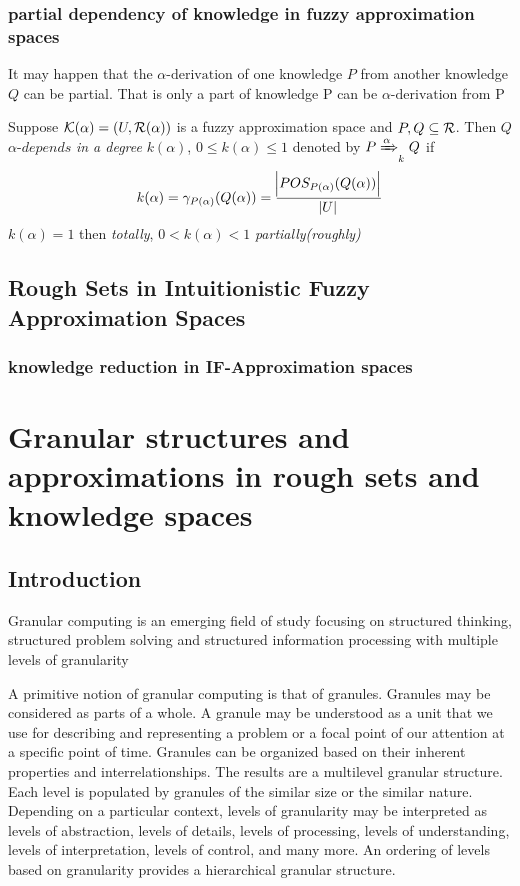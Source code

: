 \documentclass[11pt]{article}
\begin{document}
\subsubsection{partial dependency of knowledge in fuzzy approximation spaces}
\label{sec:org0351901}
It may happen that the \(\alpha\text{-derivation}\) of one knowledge \(P\) from
another knowledge \(Q\) can be partial. That is only a part of knowledge P can
be \(\alpha\text{-derivation}\) from P 

Suppose \(\mathcal{K}(\alpha)=(U,\mathcal{R}(\alpha))\) is a fuzzy approximation space and
\(P,Q\subseteq \mathcal{R}\). Then \(Q\) \(\alpha\textit{-depends}\) \emph{in a degree}
\(k(\alpha)\), \(0\le k(\alpha)\le 1\) denoted by \(P\xRightarrow{\alpha}_{k}Q\)
if 
\begin{equation*}
k(\alpha)=\gamma_{P(\alpha)}(Q(\alpha))=\frac{\abs{POS_{P(\alpha)}(Q(\alpha))}}{\abs{U}}
\end{equation*}
\(k(\alpha)=1\) then \emph{totally}, \(0<k(\alpha)<1\) \emph{partially(roughly)}

\subsection{Rough Sets in Intuitionistic Fuzzy Approximation Spaces}
\label{sec:orgde16ca6}
\subsubsection{knowledge reduction in IF-Approximation spaces}
\label{sec:org2943de8}
\section{Granular structures and approximations in rough sets and knowledge spaces}
\label{sec:org690d3aa}
\subsection{Introduction}
\label{sec:orgf27203e}
Granular computing is an emerging field of study focusing on structured
thinking, structured problem solving and structured information processing
with multiple levels of granularity 

A primitive notion of granular computing is that of granules. Granules may
be considered as parts of a whole. A granule may be understood as a unit
that we use for describing and representing a problem or a focal point of
our attention at a specific point of time. Granules can be organized based
on their inherent properties and interrelationships. The results are a
multilevel granular structure. Each level is populated by granules of the
similar size or the similar nature. Depending on a particular context,
levels of granularity may be interpreted as levels of abstraction, levels of
details, levels of processing, levels of understanding, levels of
interpretation, levels of control, and many more. An ordering of levels
based on granularity provides a hierarchical granular structure. 
\end{document}
